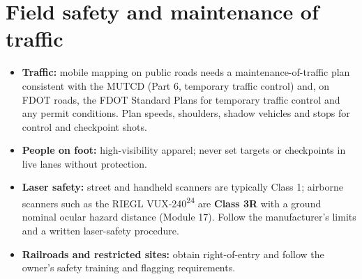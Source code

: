 \section{Field safety and maintenance of traffic}
\begin{itemize}
\item \textbf{Traffic:} mobile mapping on public roads needs a maintenance-of-traffic plan consistent with the MUTCD (Part 6, temporary traffic control) and, on FDOT roads, the FDOT Standard Plans for temporary traffic control and any permit conditions. Plan speeds, shoulders, shadow vehicles and stops for control and checkpoint shots.
\item \textbf{People on foot:} high-visibility apparel; never set targets or checkpoints in live lanes without protection.
\item \textbf{Laser safety:} street and handheld scanners are typically Class 1; airborne scanners such as the RIEGL VUX-240\textsuperscript{24} are \textbf{Class 3R} with a ground nominal ocular hazard distance (Module 17). Follow the manufacturer's limits and a written laser-safety procedure.
\item \textbf{Railroads and restricted sites:} obtain right-of-entry and follow the owner's safety training and flagging requirements.
\end{itemize}

